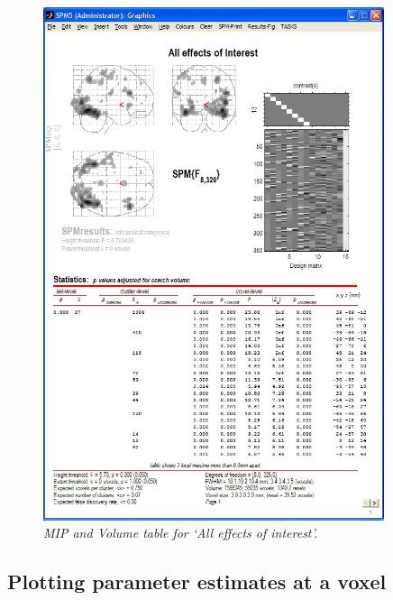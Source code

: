 \begin{figure}
\begin{center}
\includegraphics[width=100mm]{faces/cat_all_volume}
\caption{\em MIP and Volume table for `All effects of interest'. \label{cat_all_volume} }
\end{center}
\end{figure}

\subsection{Plotting parameter estimates at a voxel}

